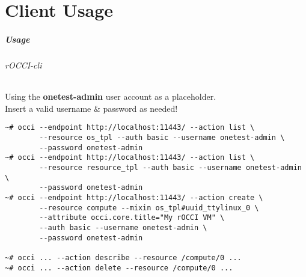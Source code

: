 \part{Client Usage}

\begin{frame}[fragile]
  \frametitle{Usage}
  \framesubtitle{rOCCI-cli}

  \begin{center}
    Using the \textbf{onetest-admin} user account as a placeholder.\\
    Insert a valid username \& password as needed!
  \end{center}

  \begin{Sbox}
  \Fontsmaller
  \begin{minipage}{\linewidth-2\fboxsep-2\fboxrule-4pt}
  \color{white}
  \begin{verbatim}
~# occi --endpoint http://localhost:11443/ --action list \
        --resource os_tpl --auth basic --username onetest-admin \
        --password onetest-admin
~# occi --endpoint http://localhost:11443/ --action list \
        --resource resource_tpl --auth basic --username onetest-admin \
        --password onetest-admin
~# occi --endpoint http://localhost:11443/ --action create \
        --resource compute --mixin os_tpl#uuid_ttylinux_0 \
        --attribute occi.core.title="My rOCCI VM" \
        --auth basic --username onetest-admin \
        --password onetest-admin

~# occi ... --action describe --resource /compute/0 ...
~# occi ... --action delete --resource /compute/0 ...
  \end{verbatim}
  \end{minipage}
  \end{Sbox}
  \fcolorbox{black}{black}{\TheSbox}
\end{frame}
